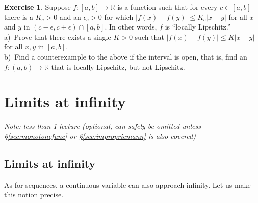 \documentclass[12pt]{book}
\newcommand{\abs}[1]{\left\lvert {#1} \right\rvert}
\newcommand{\R}{{\mathbb{R}}}
\newcommand{\sectionnotes}[1]{\noindent \emph{Note: #1} \medskip \par}
\newcommand{\sectionnewpage}{\clearpage}
\theoremstyle{plain}
\theoremstyle{remark}
\theoremstyle{definition}
\theoremstyle{exercise}
\newtheorem{exercise}{Exercise}[section]
\theoremstyle{example}
\newcommand{\sectionref}[1]{\hyperref[#1]{\S\ref*{#1}}}
\begin{document}
\begin{exercise}
Suppose $f \colon [a,b] \to \R$ is a function such that for every $c \in
[a,b]$ there is a $K_c > 0$ and an $\epsilon_c > 0$ for which
$\abs{f(x)-f(y)} \leq K_c \abs{x-y}$ for all $x$ and $y$ in
$(c-\epsilon,c+\epsilon) \cap [a,b]$.  In other words, $f$ is ``locally Lipschitz.''
\\
a)~Prove that there exists a single $K > 0$ such that
$\abs{f(x)-f(y)} \leq K \abs{x-y}$ for all $x,y$ in $[a,b]$.
\\
b)~Find a counterexample to the above if the interval is open, that is,
find an $f \colon (a,b) \to \R$ that is locally Lipschitz, but not
Lipschitz.
\end{exercise}


\sectionnewpage
\section{Limits at infinity}
\label{sec:limitatinf}

\sectionnotes{less than 1 lecture (optional, can safely be omitted unless
\sectionref{sec:monotonefunc} or
\sectionref{sec:impropriemann} is also covered)}

\subsection{Limits at infinity}

As for sequences, a continuous variable can also approach infinity.  Let
us make this notion precise.
\end{document}
